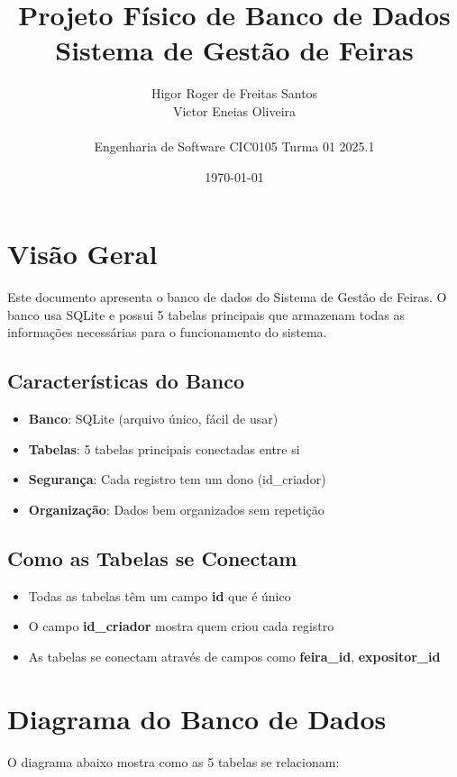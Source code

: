 \documentclass[12pt,a4paper]{article}
\title{\textbf{Projeto Físico de Banco de Dados}\\
\large Sistema de Gestão de Feiras}
\author{Higor Roger de Freitas Santos \quad 221006440\\
Victor Eneias Oliveira \quad 221038364\\
\\
Engenharia de Software CIC0105 Turma 01 2025.1}
\date{\today}
\begin{document}
\maketitle

\tableofcontents
\newpage

\section{Visão Geral}

Este documento apresenta o banco de dados do Sistema de Gestão de Feiras. O banco usa SQLite e possui 5 tabelas principais que armazenam todas as informações necessárias para o funcionamento do sistema.

\subsection{Características do Banco}

\begin{itemize}
    \item \textbf{Banco}: SQLite (arquivo único, fácil de usar)
    \item \textbf{Tabelas}: 5 tabelas principais conectadas entre si
    \item \textbf{Segurança}: Cada registro tem um dono (id\_criador)
    \item \textbf{Organização}: Dados bem organizados sem repetição
\end{itemize}

\subsection{Como as Tabelas se Conectam}

\begin{itemize}
    \item Todas as tabelas têm um campo \textbf{id} que é único
    \item O campo \textbf{id\_criador} mostra quem criou cada registro
    \item As tabelas se conectam através de campos como \textbf{feira\_id}, \textbf{expositor\_id}
\end{itemize}

\section{Diagrama do Banco de Dados}

O diagrama abaixo mostra como as 5 tabelas se relacionam:
\end{document}
